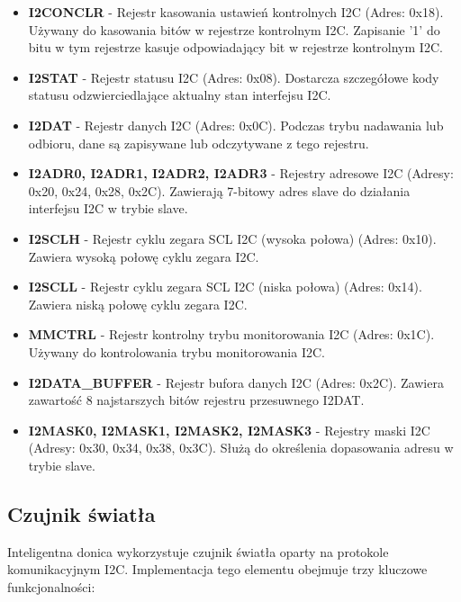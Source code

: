 \documentclass{article}
\begin{document}
\begin{itemize}
\begin{enumerate}
    \end{enumerate}
    \item \textbf{I2CONCLR} - Rejestr kasowania ustawień kontrolnych I2C (Adres: 0x18). Używany do kasowania bitów w rejestrze kontrolnym I2C. Zapisanie '1' do bitu w tym rejestrze kasuje odpowiadający bit w rejestrze kontrolnym I2C.
    \item \textbf{I2STAT} - Rejestr statusu I2C (Adres: 0x08). Dostarcza szczegółowe kody statusu odzwierciedlające aktualny stan interfejsu I2C.
    \item \textbf{I2DAT} - Rejestr danych I2C (Adres: 0x0C). Podczas trybu nadawania lub odbioru, dane są zapisywane lub odczytywane z tego rejestru.
    \item \textbf{I2ADR0, I2ADR1, I2ADR2, I2ADR3} - Rejestry adresowe I2C (Adresy: 0x20, 0x24, 0x28, 0x2C). Zawierają 7-bitowy adres slave do działania interfejsu I2C w trybie slave.
    \item \textbf{I2SCLH} - Rejestr cyklu zegara SCL I2C (wysoka połowa) (Adres: 0x10). Zawiera wysoką połowę cyklu zegara I2C.
    \item \textbf{I2SCLL} - Rejestr cyklu zegara SCL I2C (niska połowa) (Adres: 0x14). Zawiera niską połowę cyklu zegara I2C.
    \item \textbf{MMCTRL} - Rejestr kontrolny trybu monitorowania I2C (Adres: 0x1C). Używany do kontrolowania trybu monitorowania I2C.
    \item \textbf{I2DATA\_BUFFER} - Rejestr bufora danych I2C (Adres: 0x2C). Zawiera zawartość 8 najstarszych bitów rejestru przesuwnego I2DAT.
    \item \textbf{I2MASK0, I2MASK1, I2MASK2, I2MASK3} - Rejestry maski I2C (Adresy: 0x30, 0x34, 0x38, 0x3C). Służą do określenia dopasowania adresu w trybie slave.
\end{itemize}

    














\subsection{Czujnik światła}
\label{sec:czujnik_swiatla}
Inteligentna donica wykorzystuje czujnik światła oparty na protokole komunikacyjnym I2C. Implementacja tego elementu obejmuje trzy kluczowe funkcjonalności:
\end{document}

